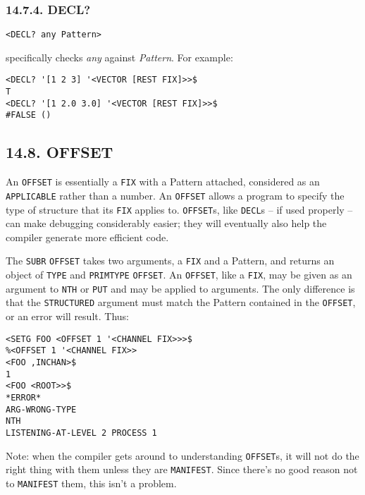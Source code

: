 \documentclass[a4paper,]{article}
\begin{document}
\subsubsection{14.7.4. DECL?}\label{decl}

\begin{verbatim}
<DECL? any Pattern>
\end{verbatim}

 specifically checks \emph{any} against \emph{Pattern}. For example:

\begin{verbatim}
<DECL? '[1 2 3] '<VECTOR [REST FIX]>>$
T
<DECL? '[1 2.0 3.0] '<VECTOR [REST FIX]>>$
#FALSE ()
\end{verbatim}

\subsection{14.8. OFFSET}\label{offset}

 An \texttt{OFFSET} is essentially a \texttt{FIX} with a Pattern
attached, considered as an \texttt{APPLICABLE} rather than a number. An \texttt{OFFSET} allows a program to specify the
type of structure that its \texttt{FIX} applies to. \texttt{OFFSET}s, like \texttt{DECL}s -- if used properly -- can make
debugging considerably easier; they will eventually also help the compiler generate more efficient code.

The \texttt{SUBR} \texttt{OFFSET} takes two arguments, a \texttt{FIX} and a Pattern, and returns an object of \texttt{TYPE}
and \texttt{PRIMTYPE} \texttt{OFFSET}. An \texttt{OFFSET}, like a \texttt{FIX}, may be given as an argument to \texttt{NTH}
or \texttt{PUT} and may be applied to arguments. The only difference is that the \texttt{STRUCTURED} argument must match
the Pattern contained in the \texttt{OFFSET}, or an error will result. Thus:

\begin{verbatim}
<SETG FOO <OFFSET 1 '<CHANNEL FIX>>>$
%<OFFSET 1 '<CHANNEL FIX>>
<FOO ,INCHAN>$
1
<FOO <ROOT>>$
*ERROR*
ARG-WRONG-TYPE
NTH
LISTENING-AT-LEVEL 2 PROCESS 1
\end{verbatim}

Note: when the compiler gets around to understanding \texttt{OFFSET}s, it will not do the right thing with them unless they
are \texttt{MANIFEST}. Since there's no good reason not to \texttt{MANIFEST} them, this isn't a problem.
\end{document}
